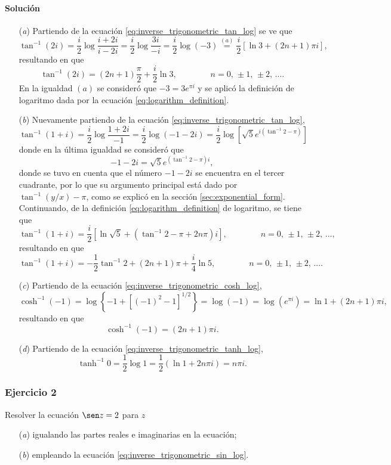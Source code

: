 \documentclass[a4paper]{report}
\begin{document}
\paragraph{Solución} 
\begin{enumerate}
 \item[(\textit{a})] Partiendo de la ecuación \ref{eq:inverse_trigonometric_tan_log} se ve que 
 \[
  \tan^{-1}(2i)=\frac{i}{2}\log\frac{i+2i}{i-2i}=\frac{i}{2}\log\frac{3i}{-i}
  =\frac{i}{2}\log(-3)\overset{(a)}{=}\frac{i}{2}\left[\ln3+(2n+1)\pi i\right],
 \]
 resultando en que 
 \[
  \tan^{-1}(2i)=(2n+1)\frac{\pi}{2}+\frac{i}{2}\ln3,
  \qquad\qquad
  n=0,\,\pm1,\,\pm2,\,\dots.
 \]
 En la igualdad \((a)\) se consideró que \(-3=3e^{\pi i}\) y se aplicó la definición de logaritmo dada por la ecuación \ref{eq:logarithm_definition}.
 \item[(\textit{b})] Nuevamente partiendo de la ecuación \ref{eq:inverse_trigonometric_tan_log},
 \[
  \tan^{-1}(1+i)=\frac{i}{2}\log\frac{1+2i}{-1}=\frac{i}{2}\log(-1-2i)
  =\frac{i}{2}\log\left[\sqrt{5}e^{i(\tan^{-1}2-\pi)}\right]
 \]
 donde en la última igualdad se consideró que 
 \[
  -1-2i=\sqrt{5}e^{(\tan^{-1}2-\pi)i},
 \]
 donde se tuvo en cuenta que el número \(-1-2i\) se encuentra en el tercer cuadrante, por lo que su argumento principal está dado por \(\tan^{-1}(y/x)-\pi\), como se explicó en la sección \ref{sec:exponential_form}. Continuando, de la definición \ref{eq:logarithm_definition} de logaritmo, se tiene que 
 \[
  \tan^{-1}(1+i)=\frac{i}{2}\left[\ln\sqrt{5}+(\tan^{-1}2-\pi+2n\pi)i\right],
  \qquad\qquad
  n=0,\,\pm1,\,\pm2,\,\dots,
 \]
 resultando en que 
 \[
  \tan^{-1}(1+i)=-\frac{1}{2}\tan^{-1}2+(2n+1)\pi+\frac{i}{4}\ln5,
  \qquad\qquad
  n=0,\,\pm1,\,\pm2,\,\dots.
 \]
 \item[(\textit{c})] Partiendo de la ecuación \ref{eq:inverse_trigonometric_cosh_log},
 \[
  \cosh^{-1}(-1)=\log\left\{-1+[(-1)^2-1]^{1/2}\right\}=\log(-1)
  =\log(e^{\pi i})=\ln1+(2n+1)\pi i,
 \]
 resultando en que 
 \[
  \cosh^{-1}(-1)=(2n+1)\pi i.
 \]
 \item[(\textit{d})] Partiendo de la ecuación \ref{eq:inverse_trigonometric_tanh_log},
 \[
  \tanh^{-1}0=\frac{1}{2}\log1=\frac{1}{2}\left(\ln1+2n\pi i\right)=n\pi i.
 \]
\end{enumerate}

\subsubsection{Ejercicio 2}

Resolver la ecuación \(\sen z=2\) para \(z\)
\begin{enumerate}
 \item[(\textit{a})] igualando las partes reales e imaginarias en la ecuación;
 \item[(\textit{b})] empleando la ecuación \ref{eq:inverse_trigonometric_sin_log}.
\end{enumerate}
\end{document}
